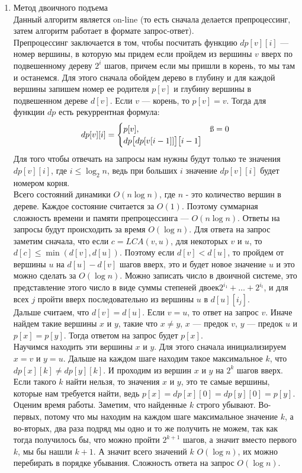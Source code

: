 \documentclass[a4paper]{article}
\begin{document}
\begin{enumerate}
	\item Метод двоичного подъема \\
	Данный алгоритм является on-line (то есть сначала делается препроцессинг, затем алгоритм работает в формате запрос-ответ). \\ 
	Препроцессинг заключается в том, чтобы посчитать функцию $dp[v][i]$ — номер вершины, в которую мы придем если пройдем из вершины $v$ вверх по подвешенному дереву $2^i$ шагов, причем если мы пришли в корень, то мы там и останемся. Для этого сначала обойдем дерево в глубину и для каждой вершины запишем номер ее родителя $p[v]$ и глубину вершины в подвешенном дереве $d[v]$. Если $v$ — корень, то $p[v]=v$. Тогда для функции $dp$ есть рекуррентная формула: 
	$$ dp[v][i] = \begin{cases}
		p[v], &\i=0\\
		dp\big[dp[v[i-1]] \big]\big[i-1 \big]
	\end{cases}$$
	Для того чтобы отвечать на запросы нам нужны будут только те значения $dp[v][i]$, где $i \leq \log_2 n$, ведь при больших $i$ значение $dp[v][i]$ будет номером корня. \\
	Всего состояний динамики $O(n \log n)$, где $n$ - это количество вершин в дереве. Каждое состояние считается за $O(1)$. Поэтому суммарная сложность времени и памяти препроцессинга — $O(n \log n)$.
	Ответы на запросы будут происходить за время $O(\log n)$. Для ответа на запрос заметим сначала, что если $c=LCA(v,u)$, для некоторых $v$ и $u$, то $d[c] \leq \min (d[v], d[u])$. Поэтому если $d[v] < d[u]$, то пройдем от вершины $u$ на $d[u]-d[v]$ шагов вверх, это и будет новое значение $u$ и это можно сделать за $O(\log n)$. Можно записать число в двоичной системе, это представление этого число в виде суммы степеней двоек$2^{i_1} + \ldots + 2^{i_t}$, и для всех $j$ пройти вверх последовательно из вершины $u$ в $d[u][i_j]$. \\
	Дальше считаем, что $d[v]=d[u]$. Если $v=u$, то ответ на запрос $v$. Иначе найдем такие вершины $x$ и $y$, такие что $x \neq y$, $x$ — предок $v$, $y$ — предок $u$ и $p[x]=p[y]$. Тогда ответом на запрос будет $p[x]$.\\
	Научимся находить эти вершины $x$ и $y$. Для этого сначала инициализируем $x=v$ и $y=u$. Дальше на каждом шаге находим такое максимальное $k$, что $dp[x][k] \neq dp[y][k]$. И проходим из вершин $x$ и $y$ на $2^k$ шагов вверх. Если такого $k$ найти нельзя, то значения $x$ и $y$, это те самые вершины, которые нам требуется найти, ведь $p[x]=dp[x][0]=dp[y][0]=p[y]$.\\
	Оценим время работы. Заметим, что найденные $k$ строго убывают. Во-первых, потому что мы находим на каждом шаге максимальное значение $k$, а во-вторых, два раза подряд мы одно и то же получить не можем, так как тогда получилось бы, что можно пройти $2^{k+1}$ шагов, а значит вместо первого $k$, мы бы нашли $k+1$. А значит всего значений $k$ $O(\log n)$, их можно перебирать в порядке убывания. Сложность ответа на запрос $O(\log n)$.


\end{enumerate}
\end{document}
